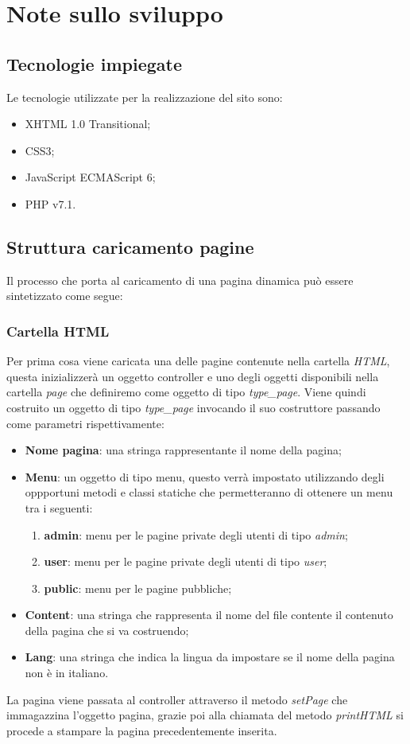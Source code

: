 \documentclass[a4paper,12pt]{article}
\begin{document}
\section{Note sullo sviluppo}
\subsection{Tecnologie impiegate}
Le tecnologie utilizzate per la realizzazione del sito sono:
\begin{itemize}
	\item XHTML 1.0 Transitional;
	\item CSS3;
	\item JavaScript ECMAScript 6;
	\item PHP v7.1.
\end{itemize}
\subsection{Struttura caricamento pagine}
Il processo che porta al caricamento di una pagina dinamica può essere sintetizzato come segue:

\subsubsection{Cartella HTML}
Per prima cosa viene caricata una delle pagine contenute nella cartella \textit{HTML}, questa inizializzerà un oggetto controller e uno degli oggetti disponibili nella cartella \textit{page} che definiremo come oggetto di tipo \textit{type_page}.
Viene quindi costruito un oggetto di tipo \textit{type_page} invocando il suo costruttore passando come parametri rispettivamente:
	\begin{itemize}
		\item \textbf{Nome pagina}: una stringa rappresentante il nome della pagina;
		\item \textbf{Menu}: un oggetto di tipo menu, questo verrà impostato utilizzando degli oppportuni metodi e classi statiche che permetteranno di ottenere un menu tra i seguenti:
		\begin{enumerate}
			\item \textbf{admin}: menu per le pagine private degli utenti di tipo \textit{admin};
			\item \textbf{user}: menu per le pagine private degli utenti di tipo \textit{user};
			\item \textbf{public}: menu per le pagine pubbliche;
		\end{enumerate}
		\item \textbf{Content}: una stringa che rappresenta il nome del file contente il contenuto della pagina che si va costruendo;
		\item \textbf{Lang}: una stringa che indica la lingua da impostare se il nome della pagina non è in italiano.
	\end{itemize}
La pagina viene passata al controller attraverso il metodo \textit{setPage} che immagazzina l'oggetto pagina, grazie poi alla chiamata del metodo \textit{printHTML} si procede a stampare la pagina precedentemente inserita.
\end{document}
